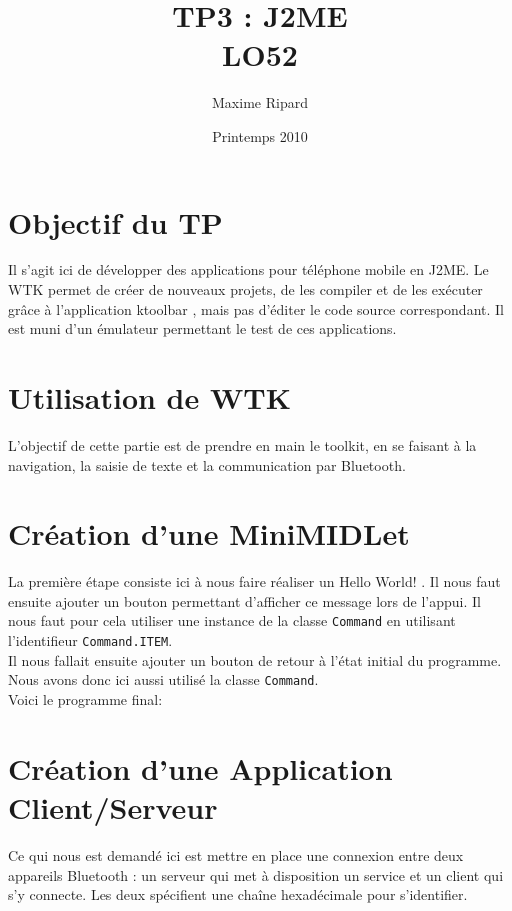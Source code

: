 \documentclass[a4paper]{article}
\title{TP3 : J2ME\\LO52}
\author{Maxime Ripard}
\date{Printemps 2010}
\begin{document}
\large
\maketitle
\newpage

\section{Objectif du TP}

Il s'agit ici de développer des applications pour téléphone mobile en J2ME.
Le WTK permet de créer de nouveaux projets, de les compiler et de les
exécuter grâce à l'application \og ktoolbar \fg, mais pas d'éditer le code
source correspondant. Il est muni d’un émulateur permettant le test de ces
applications.

\section{Utilisation de WTK}

L'objectif de cette partie est de prendre en main le toolkit, en se faisant
à la navigation, la saisie de texte et la communication par Bluetooth.

\section{Création d'une MiniMIDLet}

La première étape consiste ici à nous faire réaliser un \og Hello World! \fg
. Il nous faut ensuite ajouter un bouton permettant d'afficher ce message
lors de l'appui. Il nous faut pour cela utiliser une instance de la
classe \verb?Command? en utilisant l'identifieur \verb?Command.ITEM?.\\

Il nous fallait ensuite ajouter un bouton de retour à l'état initial du
programme. Nous avons donc ici aussi utilisé la classe \verb?Command?.\\

Voici le programme final:


\section{Création d'une Application Client/Serveur}
Ce qui nous est demandé ici est mettre en place une connexion entre deux
appareils Bluetooth : un serveur qui met à disposition un service et un
client qui s'y connecte. Les deux spécifient une chaîne hexadécimale pour
s'identifier.
\end{document}
